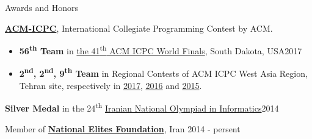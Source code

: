 \documentclass{resume} %
\begin{document}

\begin{rSection}{Awards and Honors}

	{\bf \href{http://icpc.baylor.edu/}{ACM-ICPC}}, International Collegiate Programming Contest by ACM.
	\begin{itemize}
		\item {\bf 56\textsuperscript{th} Team} in
		\href{https://icpc.baylor.edu/community/results-2017}{the 41\textsuperscript{th} ACM ICPC World Finals},
		South Dakota, USA\hfill 2017

		\item {\bf 2\textsuperscript{nd}, 2\textsuperscript{nd}, 9\textsuperscript{th} Team} in Regional Contests of ACM ICPC West Asia Region,
		Tehran site, respectively in
		\href{http://icpc.sharif.edu/acmicpc17/scoreboard/}{2017},
		\href{http://icpc.sharif.edu/acmicpc16/scoreboard/}{2016} and
		\href{http://icpc.sharif.edu/acmicpc15/scoreboard/}{2015}.
	\end{itemize}

	{\bf Silver Medal} in the 24\textsuperscript{th} \href{http://inoi.ir/}{Iranian National Olympiad in Informatics}\hfill 2014

	Member of \href{https://www.bmn.ir/}{{\bf National Elites Foundation}}, Iran \hfill 2014 - persent
	
\end{rSection}

\end{document}
